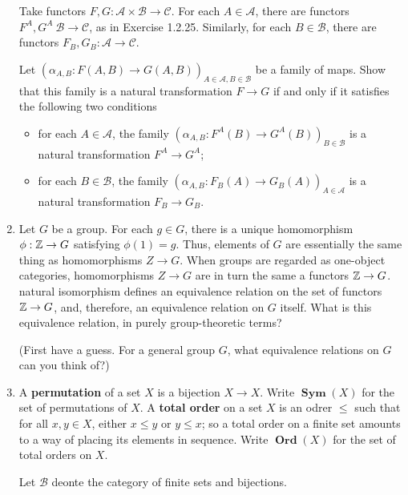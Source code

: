 \documentclass[12pt,a4paper]{report}
\newcommand{\CAT}[1]{\mathscr{#1}}
\newcommand{\CATSET}[1]{\operatorname{\textbf{#1}}}
\begin{document}
\begin{enumerate}[label=1.3.\arabic*]
Take functors $F,G : \CAT{A}\times \CAT{B} \to \CAT{C}$.  For each $A\in \CAT{A}$, there are functors $F^A, G^A \: \CAT{B}\to \CAT{C}$, as in Exercise 1.2.25.  Similarly, for each $B \in \CAT{B}$, there are functors $F_B, G_B:\CAT{A}\to\CAT{C}$.

Let $(\alpha_{A,B}:F(A,B) \to G(A,B))_{A\in\CAT{A},B\in\CAT{B}}$ be a family of maps.  Show that this family is a natural transformation $F \to G$ if and only if it satisfies the following two conditions

\begin{itemize}
	\item for each $A \in \CAT{A}$, the family $(\alpha_{A,B}: F^A(B) \to G^A(B))_{B \in \CAT{B}}$ is a natural transformation $F^A \to G^A$;
	\item for each $B \in \CAT{B}$, the family $(\alpha_{A,B}:F_B(A)\to G_B(A))_{A\in \CAT{A}}$ is a natural transformation $F_B\to G_B$.
\end{itemize}

\item Let $G$ be a group.  For each $g \in G$, there is a unique homomorphism $\phi: \mathbb{Z} \to G$ satisfying $\phi(1)=g$.  Thus, elements of $G$ are essentially the same thing as homomorphisms $Z \to G$. When groups are regarded as one-object categories, homomorphisms $Z \to G$ are in turn the same a functors $\mathbb{Z} \to G$.  natural isomorphism defines an equivalence relation on the set of functors $\mathbb{Z} \to G$, and, therefore, an equivalence relation on $G$ itself.  What is this equivalence relation, in purely group-theoretic terms?

(First have a guess.  For a general group $G$, what equivalence relations on $G$ can you think  of?)

\item A \textbf{permutation} of a set $X$ is a bijection $X \to X$. Write $\CATSET{Sym}(X)$ for the set of permutations of $X$.  A \textbf{total order} on a set $X$ is an odrer $\le$ such that for all $x,y\in X$, either $x \le y$ or $ y\le x$; so a total order on a finite set amounts to a way of placing its elements in sequence.  Write $\CATSET{Ord}(X)$ for the set of total orders on $X$.

Let $\CAT{B}$ deonte the category of finite sets and bijections.


\end{enumerate}
\end{document}
